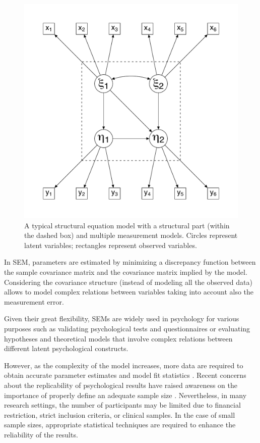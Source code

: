 \documentclass[graybox]{svmult}
\begin{document}
\begin{figure}[t]
	\sidecaption
	\label{fig:figure1}
	\includegraphics[width = .50\textwidth]{figure/figure1}
	\caption{A typical structural equation model with a structural part (within the dashed box) and multiple measurement models. Circles represent latent variables; rectangles represent observed variables.}
\end{figure}

In SEM, parameters are estimated by minimizing a discrepancy function between the sample covariance matrix and the covariance matrix implied by the model. Considering the covariance structure (instead of modeling all the observed data) allows to model complex relations between variables taking into account also the  measurement error.


Given their great flexibility, SEMs are widely used in psychology for various purposes such as validating psychological tests and questionnaires or evaluating hypotheses and theoretical models that involve complex relations between different latent psychological constructs.

However, as the complexity of the model increases, more data are required to obtain accurate parameter estimates and model fit statistics \cite{wolfSampleSizeRequirements2013}. Recent concerns about the replicability of psychological results have raised awareness on the importance of properly define an adequate sample size \cite{ioannidisWhyMostPublished2005, opensciencecollaborationEstimatingReproducibilityPsychological2015}.  Nevertheless, in many research settings, the number of participants may be limited due to financial restriction, strict inclusion criteria, or clinical samples. In the case of small sample sizes, appropriate statistical techniques are required to enhance the reliability of the results.
\end{document}
